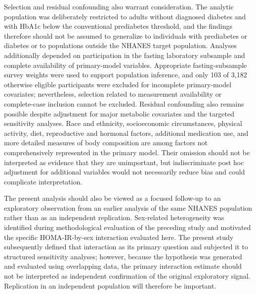 \documentclass[11pt]{article}
\begin{document}
Selection and residual confounding also warrant consideration. The analytic
population was deliberately restricted to adults without diagnosed diabetes
and with HbA1c below the conventional prediabetes threshold, and the findings
therefore should not be assumed to generalize to individuals with
prediabetes or diabetes or to populations outside the NHANES target
population. Analyses additionally depended on participation in the fasting
laboratory subsample and complete availability of primary-model variables.
Appropriate fasting-subsample survey weights were used to support population
inference, and only 103 of 3,182 otherwise eligible participants were
excluded for incomplete primary-model covariates; nevertheless, selection
related to measurement availability or complete-case inclusion cannot be
excluded. Residual confounding also remains possible despite adjustment for
major metabolic covariates and the targeted sensitivity analyses. Race and
ethnicity, socioeconomic circumstances, physical activity, diet,
reproductive and hormonal factors, additional medication use, and more
detailed measures of body composition are among factors not comprehensively
represented in the primary model. Their omission should not be interpreted
as evidence that they are unimportant, but indiscriminate post hoc
adjustment for additional variables would not necessarily reduce bias and
could complicate interpretation.

The present analysis should also be viewed as a focused follow-up to an
exploratory observation from an earlier analysis of the same NHANES
population rather than as an independent replication. Sex-related
heterogeneity was identified during methodological evaluation of the
preceding study and motivated the specific HOMA-IR-by-sex interaction
evaluated here. The present study subsequently defined that interaction as
its primary question and subjected it to structured sensitivity analyses;
however, because the hypothesis was generated and evaluated using
overlapping data, the primary interaction estimate should not be interpreted
as independent confirmation of the original exploratory signal. Replication
in an independent population will therefore be important.
\end{document}
